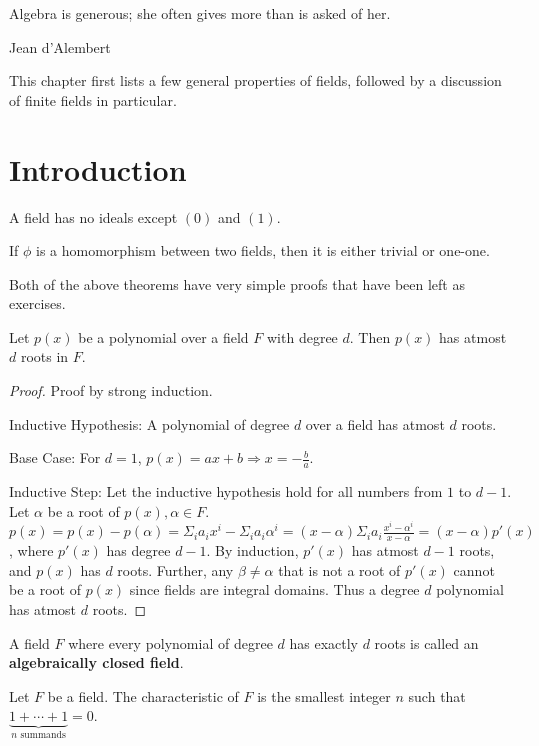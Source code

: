 \epigraph{Algebra is generous; she often gives more than is asked of her.}{Jean d’Alembert}
This chapter first lists a few general properties of fields, followed by a discussion of finite fields in particular.
\section{Introduction}
\begin{theorem} \label{theorem:noideals}
  A field has no ideals except $(0)$ and $(1)$.
\end{theorem}
\begin{theorem} \label{theorem:nomorphisms}
  If $\phi$ is a homomorphism between two fields, then it is either trivial or one-one.
\end{theorem}
Both of the above theorems have very simple proofs that have been left as exercises.
\begin{theorem} \label{theorem:polyroots}
  Let $p(x)$ be a polynomial over a field $F$ with degree $d$.
  Then $p(x)$ has atmost $d$ roots in $F$.
\end{theorem}
\begin{proof} \label{proof:polyroots}
  Proof by strong induction.
  \par
  Inductive Hypothesis: A polynomial of degree $d$ over a field has atmost $d$ roots.
  \par
  Base Case: For $d = 1$, $p(x) = ax + b \Rightarrow x = - \frac{b}{a}$.
  \par
  Inductive Step: Let the inductive hypothesis hold for all numbers from $1$ to $d-1$.
  Let $\alpha$ be a root of $p(x), \alpha \in F$.
    $p(x) = p(x) - p(\alpha) = \Sigma_{i} a_{i} x^{i} - \Sigma_{i} a_{i} \alpha^{i} = (x - \alpha) \Sigma_{i} a_{i} \frac{x^{i} - \alpha^{i}}{x - \alpha} = (x - \alpha) p'(x)$, where $p'(x)$ has degree $d - 1$.
    By induction, $p'(x)$ has atmost $d - 1$ roots, and $p(x)$ has $d$ roots.
    Further, any $\beta \neq \alpha$ that is not a root of $p'(x)$ cannot be a root of $p(x)$ since fields are integral domains.
    Thus a degree $d$ polynomial has atmost $d$ roots.
\end{proof}
\begin{definition} \label{def:acf}
  A field $F$ where every polynomial of degree $d$ has exactly $d$ roots is called an \textbf{algebraically closed field}.
\end{definition}
\begin{definition} \label{def:char}
  Let $F$ be a field.
  The characteristic of $F$ is the smallest integer $n$ such that $\underbrace{1+\cdots+1}_{n \text{ summands}} = 0$.
\end{definition}
